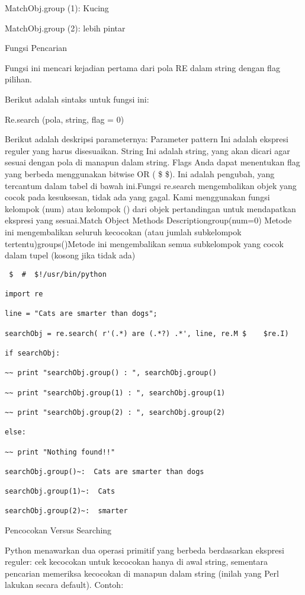 \begin {enumerate}
\begin {enumerate}
MatchObj.group (1): Kucing

MatchObj.group (2): lebih pintar

Fungsi Pencarian

Fungsi ini mencari kejadian pertama dari pola RE dalam string dengan flag pilihan.

Berikut adalah sintaks untuk fungsi ini:

Re.search (pola, string, flag = 0)

Berikut adalah deskripsi parameternya:
Parameter pattern Ini adalah ekspresi reguler yang harus disesuaikan. String Ini adalah string, yang akan dicari agar sesuai dengan pola di manapun dalam string. Flags Anda dapat menentukan flag yang berbeda menggunakan bitwise OR ( \$    \$). Ini adalah pengubah, yang tercantum dalam tabel di bawah ini.Fungsi re.search mengembalikan objek yang cocok pada kesuksesan, tidak ada yang gagal. Kami menggunakan fungsi kelompok (num) atau kelompok () dari objek pertandingan untuk mendapatkan ekspresi yang sesuai.Match Object Methods Descriptiongroup(num=0) Metode ini mengembalikan seluruh kecocokan (atau jumlah subkelompok tertentu)groups()Metode ini mengembalikan semua subkelompok yang cocok dalam tupel (kosong jika tidak ada)

\begin{verbatim}
 $  #  $!/usr/bin/python

import re

line = "Cats are smarter than dogs";

searchObj = re.search( r'(.*) are (.*?) .*', line, re.M $    $re.I)

if searchObj:

~~ print "searchObj.group() : ", searchObj.group()

~~ print "searchObj.group(1) : ", searchObj.group(1)

~~ print "searchObj.group(2) : ", searchObj.group(2)

else:

~~ print "Nothing found!!"

searchObj.group()~:  Cats are smarter than dogs

searchObj.group(1)~:  Cats

searchObj.group(2)~:  smarter
\end{verbatim}

Pencocokan Versus Searching

Python menawarkan dua operasi primitif yang berbeda berdasarkan ekspresi reguler: cek kecocokan untuk kecocokan hanya di awal string, sementara pencarian memeriksa kecocokan di manapun dalam string (inilah yang Perl lakukan secara default).
Contoh:


\end{enumerate}
\end{enumerate}
